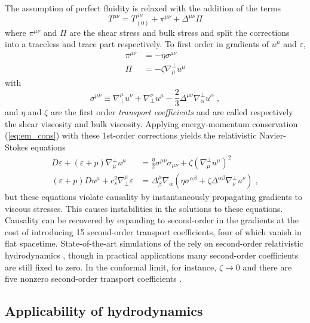 The assumption of perfect fluidity is relaxed with the addition of the terms
\begin{equation}
T^{\mu\nu} = T^{\mu\nu}_{(0)} + \pi^{\mu\nu} + \Delta^{\mu\nu}\Pi
\end{equation}
where $\pi^{\mu\nu}$ and $\Pi$ are the shear stress and bulk stress and split the corrections into a traceless and trace part respectively.
To first order in gradients of $u^\mu$ and $\varepsilon$,
\begin{align}
  \label{eq:shear_stress}
  \pi^{\mu\nu} &= - \eta \sigma^{\mu\nu} \\
  \label{eq:bulk_stress}
  \Pi          &= - \zeta \nabla^\perp_\mu u^\mu
\end{align}
with
\begin{equation}
  \label{eq:sigma_tensor}
  \sigma^{\mu\nu} \equiv \nabla_\perp^\mu u^\nu + \nabla_\perp^\nu u^\mu - \frac{2}{3} \Delta^{\mu\nu}\nabla^\perp_\alpha u^\alpha \; ,
\end{equation}
and $\eta$ and $\zeta$ are the first order \emph{transport coefficients} and are called respectively the shear viscosity and bulk viscosity.
Applying energy-momentum conservation (\cref{eq:em_cons}) with these 1st-order corrections yields the relativistic Navier-Stokes equations
\begin{align}
  D\varepsilon + \left(\varepsilon + p\right)\nabla^\perp_\mu u^\mu &= \frac{\eta}{2}\sigma^{\mu\nu}\sigma_{\mu\nu} + \zeta \left( \nabla^\perp_\mu u^\mu \right)^2 \\
  \left(\varepsilon + p\right)Du^\mu + c_s^2 \nabla_\perp^\mu \varepsilon &= \Delta^\mu_\beta \nabla_\alpha \left( \eta \sigma^{\alpha\beta} + \zeta \Delta^{\alpha\beta} \nabla^\perp_\nu u^\nu \right) \;,
\end{align}
but these equations violate causality by instantaneously propagating gradients to viscous stresses.
This causes instabilities in the solutions to these equations.
Causality can be recovered by expanding to second-order in the gradients \cite{Israel:1976tn} at the cost of introducing 15 second-order transport coefficients, four of which vanish in flat spacetime.
State-of-the-art simulations of the \qgp rely on second-order relativistic hydrodynamics \cite{Israel:1979wp}, though in practical applications many second-order coefficients are still fixed to zero.
In the conformal limit, for instance, $\zeta \rightarrow 0$ and there are five nonzero second-order transport coefficients \cite{Baier:2007ix,Marrochio:2013wla}.

\subsection{Applicability of hydrodynamics}
\label{subsec:hydro_applicability}

